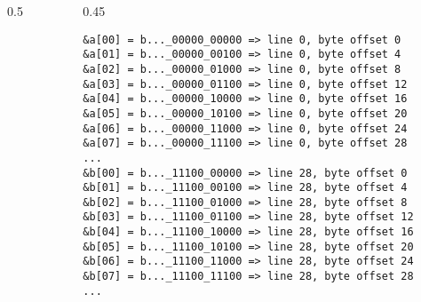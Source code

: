 \documentclass[presentation,aspectratio=43,10pt]{beamer}
\begin{document}
\begin{frame}[fragile]
\begin{columns}
\begin{column}{0.5\pagewidth}
\begin{onlyenv}
      \end{onlyenv}%
    \end{column}
    \begin{column}{0.45\pagewidth}
\begin{verbatim}
&a[00] = b..._00000_00000 => line 0, byte offset 0
&a[01] = b..._00000_00100 => line 0, byte offset 4
&a[02] = b..._00000_01000 => line 0, byte offset 8
&a[03] = b..._00000_01100 => line 0, byte offset 12
&a[04] = b..._00000_10000 => line 0, byte offset 16
&a[05] = b..._00000_10100 => line 0, byte offset 20
&a[06] = b..._00000_11000 => line 0, byte offset 24
&a[07] = b..._00000_11100 => line 0, byte offset 28
...
&b[00] = b..._11100_00000 => line 28, byte offset 0
&b[01] = b..._11100_00100 => line 28, byte offset 4
&b[02] = b..._11100_01000 => line 28, byte offset 8
&b[03] = b..._11100_01100 => line 28, byte offset 12
&b[04] = b..._11100_10000 => line 28, byte offset 16
&b[05] = b..._11100_10100 => line 28, byte offset 20
&b[06] = b..._11100_11000 => line 28, byte offset 24
&b[07] = b..._11100_11100 => line 28, byte offset 28
...
\end{verbatim}
    \end{column}
  \end{columns}
\end{frame}
\end{document}
